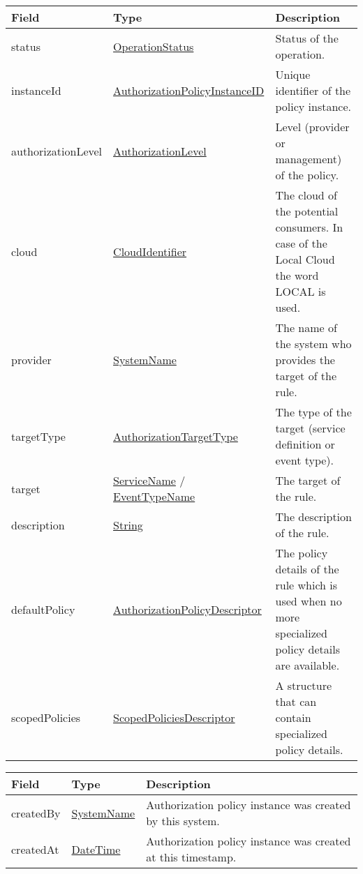 \documentclass[a4paper]{arrowhead}
\newcommand{\pref}[1]{{\textcolor{ArrowheadGrey}{\hyperref[sec:model:primitives:#1]{#1}}}}
\begin{document}
\begin{table}[ht!]
\begin{tabularx}{\textwidth}{| p{4.25cm} | p{4.5cm} | X |} \hline
\rowcolor{gray!33} Field & Type      & Description \\ \hline
status & \pref{OperationStatus} & Status of the operation. \\ \hline
instanceId & \pref{AuthorizationPolicyInstanceID} & Unique identifier of the policy instance. \\ \hline
authorizationLevel & \pref{AuthorizationLevel} & Level (provider or management) of the policy. \\ \hline
cloud & \pref{CloudIdentifier} & The cloud of the potential consumers. In case of the Local Cloud the word LOCAL is used. \\ \hline
provider & \pref{SystemName} & The name of the system who provides the target of the rule. \\ \hline
targetType & \pref{AuthorizationTargetType} & The type of the target (service definition or event type). \\ \hline
target &  \pref{ServiceName} / \pref{EventTypeName} & The target of the rule. \\ \hline
description & \pref{String} & The description of the rule. \\ \hline
defaultPolicy & \hyperref[sec:model:AuthorizationPolicyDescriptor]{AuthorizationPolicyDescriptor} & The policy details of the rule which is used when no more specialized policy details are available. \\ \hline
scopedPolicies & \hyperref[sec:model:ScopedPoliciesDescriptor]{ScopedPoliciesDescriptor} & A structure that can contain specialized po\-licy details. \\ \hline
\end{tabularx}
\end{table}

\begin{table}[ht!]
\begin{tabularx}{\textwidth}{| p{4.25cm} | p{4.5cm} | X |} \hline
\rowcolor{gray!33} Field & Type      & Description \\ \hline
createdBy & \pref{SystemName} & Authorization policy instance was created by this system. \\ \hline
createdAt & \pref{DateTime} & Authorization policy instance was created at this timestamp. \\ \hline
\end{tabularx}
\end{table}
\end{document}
